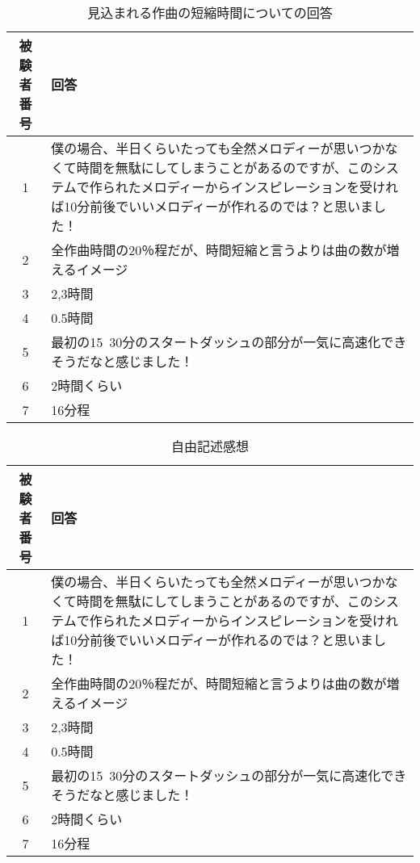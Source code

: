\begin{table}[htbp]
  \begin{center}
    \caption{見込まれる作曲の短縮時間についての回答}
    \begin{tabular}{cp{30em}}
      \hline
      被験者番号 & 回答\rule[-3mm]{0mm}{8mm} \\ \hline \hline
      1 & 僕の場合、半日くらいたっても全然メロディーが思いつかなくて時間を無駄にしてしまうことがあるのですが、このシステムで作られたメロディーからインスピレーションを受ければ10分前後でいいメロディーが作れるのでは？と思いました！\rule[-3mm]{0mm}{8mm} \\ \hline
      2 & 全作曲時間の20％程だが、時間短縮と言うよりは曲の数が増えるイメージ\rule[-3mm]{0mm}{8mm} \\ \hline
      3 & 2,3時間\rule[-3mm]{0mm}{8mm} \\ \hline
      4 & 0.5時間\rule[-3mm]{0mm}{8mm} \\ \hline
      5 & 最初の15~30分のスタートダッシュの部分が一気に高速化できそうだなと感じました！\rule[-3mm]{0mm}{8mm} \\ \hline
      6 & 2時間くらい\rule[-3mm]{0mm}{8mm} \\ \hline
      7 & 16分程\rule[-3mm]{0mm}{8mm} \\ \hline
    \end{tabular}
  \end{center}
\end{table}

\begin{table}[htbp]
  \begin{center}
    \caption{自由記述感想}
    \begin{tabular}{cp{30em}}
      \hline
      被験者番号 & 回答\rule[-3mm]{0mm}{8mm} \\ \hline \hline
      1 & 僕の場合、半日くらいたっても全然メロディーが思いつかなくて時間を無駄にしてしまうことがあるのですが、このシステムで作られたメロディーからインスピレーションを受ければ10分前後でいいメロディーが作れるのでは？と思いました！\rule[-3mm]{0mm}{8mm} \\ \hline
      2 & 全作曲時間の20％程だが、時間短縮と言うよりは曲の数が増えるイメージ\rule[-3mm]{0mm}{8mm} \\ \hline
      3 & 2,3時間\rule[-3mm]{0mm}{8mm} \\ \hline
      4 & 0.5時間\rule[-3mm]{0mm}{8mm} \\ \hline
      5 & 最初の15~30分のスタートダッシュの部分が一気に高速化できそうだなと感じました！\rule[-3mm]{0mm}{8mm} \\ \hline
      6 & 2時間くらい\rule[-3mm]{0mm}{8mm} \\ \hline
      7 & 16分程\rule[-3mm]{0mm}{8mm} \\ \hline
    \end{tabular}
  \end{center}
\end{table}